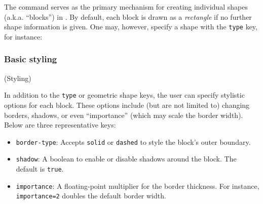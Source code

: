 \documentclass[show-experimental]{l3doc}
\begin{document}
\begin{function}{\nskBlock}
	\begin{syntax}
		 
	\end{syntax}
	The command  serves as the primary mechanism for creating
	individual shapes (a.k.a. “blocks”) in \pkg{neural-sketch}.
	By default, each block is drawn as a \emph{rectangle} if no further
	shape information is given. One may, however, specify a shape with the
	\verb|type| key, for instance:

	\begin{nskusage}
		\nskBlock[
			type=diamond,
			fill=nskBlue,
			text-center={Diamond Shape}
		]
	\end{nskusage}
\end{function}


\subsubsection{Basic styling}

\begin{function}{\nskBlock (Styling)}
	\begin{syntax}
		 \oarg{key = value list}
	\end{syntax}
	In addition to the \texttt{type} or geometric shape keys, the user can specify
	stylistic options for each block. These options include (but are not limited to)
	changing borders, shadows, or even “importance” (which may scale the border width).
	Below are three representative keys:

	\begin{itemize}
		\item \verb|border-type|: Accepts \texttt{solid} or \texttt{dashed} to style
		      the block’s outer boundary.
		\item \verb|shadow|: A boolean to enable or disable shadows around the block.
		      The default is \texttt{true}.
		\item \verb|importance|: A floating-point multiplier for the border thickness.
		      For instance, \verb|importance=2| doubles the default border width.
	\end{itemize}
\end{function}

\begin{nskexample}[]
	\begin{nskFigure}[center]
		\nskBlock[
			id=A,
			text-north = {solid},
			border-type=solid,
		]
		\nskBlock[
			id=B,
			text-north = {dashed},
			border-type=dashed,
			pos={right=.5cm of A},
		]
		\nskBlock[
			id=C,
			text-north = {shadow=true},
			shadow=true,
			pos={right=.5cm of B},
		]
		\nskBlock[
			id=D,
			text-north = {shadow=false},
			shadow=false,
			pos={right=.5cm of C},
		]
		\nskBlock[
			id=E,
			text-north = {important},
			shadow=false,
			importance=2,
			pos={right=.5cm of D},
		]
	\end{nskFigure}
\end{nskexample}
\end{document}
